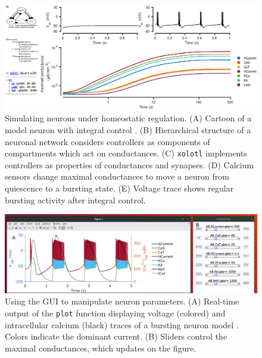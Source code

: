 \documentclass{frontiersSCNS} %
\begin{document}
\begin{figure}
	\centering
	\includegraphics[width=1.0\linewidth]{gfx/figure_integral_control}
	\caption{Simulating neurons under homeostatic regulation. (A) Cartoon of a model neuron \autocite{liuModelNeuronActivitydependent1998} with integral control \autocite{olearyCorrelationsIonChannel2013}. (B) Hierarchical structure of a neuronal network considers controllers as components of compartments which act on conductances. (C) \texttt{xolotl} implements controllers as properties of conductances and synapses. (D) Calcium sensors change maximal conductances to move a neuron from quiescence to a bursting state. (E) Voltage trace shows regular bursting activity after integral control.}
	\label{fig:figureintegralcontrol}
\end{figure}

\begin{figure}
	\centering
	\includegraphics[width=1.0\linewidth]{gfx/puppeteer_screenshot}
	\caption{Using the GUI to manipulate neuron parameters. (A) Real-time output of the \texttt{plot} function displaying voltage (colored) and intracellular calcium (black) traces of a bursting neuron model \autocite{prinzAlternativeHandtuningConductancebased2003, prinzSimilarNetworkActivity2004}. Colors indicate the dominant current. (B) Sliders control the maximal conductances, which updates on the figure.}
	\label{fig:puppeteerscreenshot}
\end{figure}
\end{document}
